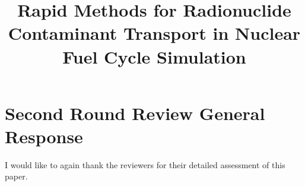 \documentclass[answers,12pt]{exam}
\begin{document}



\title{Rapid Methods for Radionuclide Contaminant Transport in Nuclear Fuel 
        Cycle Simulation}



%

\section*{Second Round Review General Response}
I would like to again thank the reviewers for their detailed assessment of 
this paper. 
\end{document}
